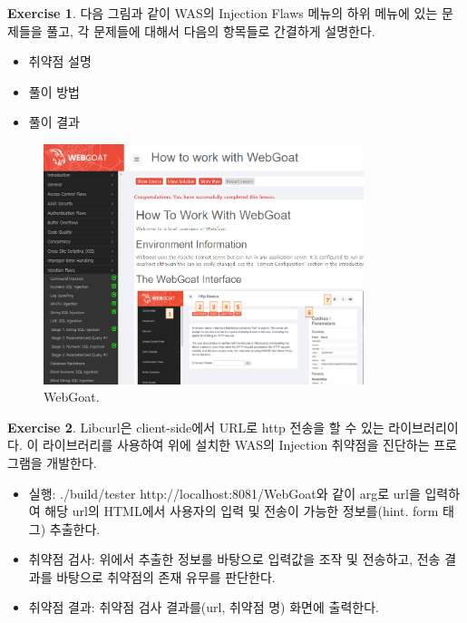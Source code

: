 \documentclass[a4paper, 11pt]{article}
\theoremstyle{definition}
\newtheorem{exercise}{Exercise}
\begin{document}
\begin{exercise}

다음 그림과 같이 WAS의 Injection Flaws 메뉴의 하위 메뉴에 있는 문제들을 풀고, 각 문제들에 대해서 다음의 항목들로 간결하게 설명한다. 

\begin{itemize}
  \item 취약점 설명
  \item 풀이 방법
  \item 풀이 결과
\end{itemize}

\begin{figure}[h]
  \includegraphics[height=7cm]{webgoat.png}
  \caption{WebGoat.}
  \label{fig:webgoat}
\end{figure}

\end{exercise}

\begin{exercise}

Libcurl\cite{3}은 client-side에서 URL로 http 전송을 할 수 있는 라이브러리이다. 이 라이브러리를 사용하여 위에 설치한 WAS의 Injection 취약점을 진단하는 프로그램을 개발한다. 

\begin{itemize}
  \item 실행: ./build/tester http://localhost:8081/WebGoat와 같이 arg로 url을 입력하여 해당 url의 HTML에서 사용자의 입력 및 전송이 가능한 정보를(hint. form 태그) 추출한다. \cite{4}
  \item 취약점 검사: 위에서 추출한 정보를 바탕으로 입력값을 조작 및 전송하고,\cite{5} 전송 결과를 바탕으로 취약점의 존재 유무를 판단한다. \cite{6}
  \item 취약점 결과: 취약점 검사 결과를(url, 취약점 명) 화면에 출력한다. 
\end{itemize}

\end{exercise}
\end{document}
